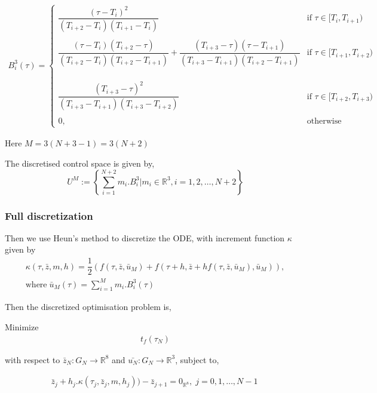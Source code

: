 \documentclass{article}
\begin{document}
\begin{align}    
B_i^3(\tau) = 
\begin{cases}
      \dfrac{(\tau - T_i)^2}{ (T_{i+2}-T_i)(T_{i+1} - T_i)} & \text{if } \tau \in [T_i, T_{i+1})\\\\
      \dfrac{(\tau - T_i)(T_{i+2}-\tau)}{(T_{i+2}-T_i)(T_{i+2} - T_{i+1})} + 
      \dfrac{(T_{i+3}-\tau)(\tau-T_{i+1})}{(T_{i+3}-T_{i+1})(T_{i+2} - T_{i+1})} & \text{if } \tau \in [T_{i+1}, T_{i+2}) \\\\
     \\\\
      \dfrac{(T_{i+3} - \tau)^2}{ (T_{i+3}-T_{i+1})(T_{i+3} - T_{i+2})} & \text{if } \tau \in [T_{i+2}, T_{i+3}) \\\\
      0, & \text{otherwise}
\end{cases}
\end{align}

Here \( M = 3(N+3-1) = 3(N+2) \)

The discretised control space is given by,
\begin{equation}
    U^M := \left\{ \sum_{i=1}^{N+2} m_i. B_i^3 | m_i \in \mathbb{R}^3, i =1,2, \dots, N+2 \right\}
\end{equation}


\subsubsection{Full discretization}

Then we use Heun's method to discretize the ODE, with increment function \(\kappa\) given by
\begin{align*}
    \kappa(\tau, \bar{z}, m, h) = \dfrac{1}{2}(f(\tau, \bar{z}, \bar{u}_M) + f(\tau + h, \bar{z} + hf(\tau, \bar{z}, \bar{u}_M), \bar{u}_M)),\\
    \text{where} \; \bar{u}_M(\tau) = \sum_{i=1}^M m_i. B_i^3 (\tau)
\end{align*}


Then the discretized optimisation problem is, 

Minimize
\begin{align*}
    t_f(\tau_N)
\end{align*}
 
with respect to \(\bar{z}_N : G_N \xrightarrow{} \mathbb{R}^8\)  and \(\bar{u_N}: G_N \xrightarrow{} \mathbb{R}^3\),
subject to,

\begin{align*}
    \bar{z}_j + h_j. \kappa(\tau_j,\bar{z}_j,m, h_j)) - \bar{z}_{j+1} = 0_{\mathbb{R}^8}, \; j =0,1,\dots, N-1 \
\end{align*}
\end{document}
